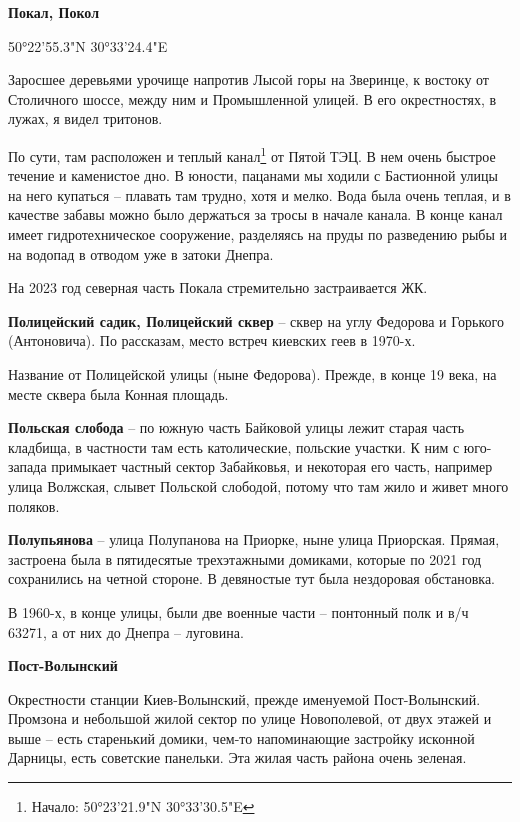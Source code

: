 \textbf{Покал, Покол} 

50°22'55.3"N 30°33'24.4"E

Заросшее деревьями урочище напротив Лысой горы на Зверинце, к востоку от Столичного шоссе, между ним и Промышленной улицей. В его окрестностях, в лужах, я видел тритонов.

По сути, там расположен и теплый канал\footnote{Начало: 50°23'21.9"N 30°33'30.5"E} от Пятой ТЭЦ. В нем очень быстрое течение и каменистое дно. В юности, пацанами мы ходили с Бастионной улицы на него купаться – плавать там трудно, хотя и мелко. Вода была очень теплая, и в качестве забавы можно было держаться за тросы в начале канала. В конце канал имеет гидротехническое сооружение, разделяясь на пруды по разведению рыбы и на водопад в отводом уже в затоки Днепра.

На 2023 год северная часть Покала стремительно застраивается ЖК.\\

\medskip

\textbf{Полицейский садик, Полицейский сквер} – сквер на углу Федорова и Горького (Антоновича). По рассказам, место встреч киевских геев в 1970-х.

Название от Полицейской улицы (ныне Федорова). Прежде, в конце 19 века, на месте сквера была Конная площадь.\\

\medskip


\textbf{Польская слобода} – по южную часть Байковой улицы лежит старая часть кладбища, в частности там есть католические, польские участки. К ним с юго-запада примыкает частный сектор Забайковья, и некоторая его часть, например улица Волжская, слывет Польской слободой, потому что там жило и живет много поляков.\\

\medskip

\textbf{Полупьянова} – улица Полупанова на Приорке, ныне улица Приорская. Прямая, застроена была в пятидесятые трехэтажными домиками, которые по 2021 год сохранились на четной стороне. В девяностые тут была нездоровая обстановка.

В 1960-х, в конце улицы, были две военные части – понтонный полк и в/ч 63271, а от них до Днепра – луговина.\\

\medskip

\textbf{Пост-Волынский}

Окрестности станции Киев-Волынский, прежде именуемой Пост-Волынский. Промзона и небольшой жилой сектор по улице Новополевой, от двух этажей и выше – есть старенький домики, чем-то напоминающие застройку исконной Дарницы, есть советские  панельки. Эта жилая часть района очень зеленая.\\


